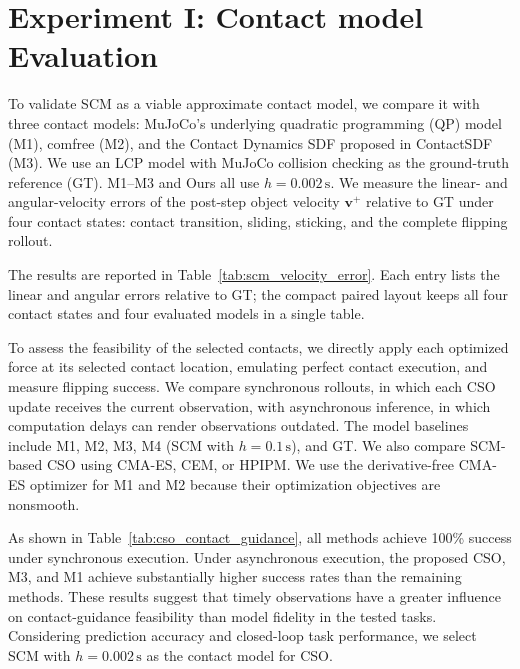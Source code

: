 \section{Experiment I: Contact model Evaluation}
\label{sec:experiment}
\label{sec:scm_evaluation}

To validate SCM as a viable approximate contact model, we compare it with three contact models: MuJoCo's underlying quadratic programming (QP) model (M1), comfree (M2), and the Contact Dynamics SDF proposed in ContactSDF~\cite{yang2024contactsdf} (M3). We use an LCP model with MuJoCo collision checking as the ground-truth reference (GT). M1--M3 and Ours all use $h=0.002\,\mathrm{s}$. We measure the linear- and angular-velocity errors of the post-step object velocity $\boldsymbol{v}^{+}$ relative to GT under four contact states: contact transition, sliding, sticking, and the complete flipping rollout.

The results are reported in Table~\ref{tab:scm_velocity_error}. Each entry lists the linear and angular errors relative to GT; the compact paired layout keeps all four contact states and four evaluated models in a single table.

To assess the feasibility of the selected contacts, we directly apply each optimized force at its selected contact location, emulating perfect contact execution, and measure flipping success. We compare synchronous rollouts, in which each CSO update receives the current observation, with asynchronous inference, in which computation delays can render observations outdated. The model baselines include M1, M2, M3, M4 (SCM with $h=0.1\,\mathrm{s}$), and GT. We also compare SCM-based CSO using CMA-ES, CEM, or HPIPM. We use the derivative-free CMA-ES optimizer for M1 and M2 because their optimization objectives are nonsmooth.

As shown in Table~\ref{tab:cso_contact_guidance}, all methods achieve 100\% success under synchronous execution. Under asynchronous execution, the proposed CSO, M3, and M1 achieve substantially higher success rates than the remaining methods. These results suggest that timely observations have a greater influence on contact-guidance feasibility than model fidelity in the tested tasks. Considering prediction accuracy and closed-loop task performance, we select SCM with $h=0.002\,\mathrm{s}$ as the contact model for CSO.


